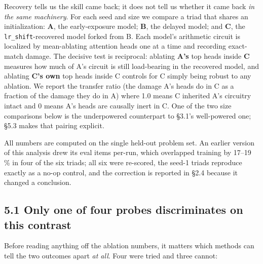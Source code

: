 \documentclass[11pt]{article}
\begin{document}
Recovery tells us the skill came back; it does not tell us whether it came back \emph{in the same
machinery}. For each seed and size we compare a triad that shares an initialization: \textbf{A},
the early-exposure model; \textbf{B}, the delayed model; and \textbf{C}, the \texttt{lr\_shift}-recovered model
forked from B. Each model's arithmetic circuit is localized by mean-ablating attention heads
one at a time and recording exact-match damage. The decisive test is reciprocal: ablating
\textbf{A's} top heads inside \textbf{C} measures how much of A's circuit is still load-bearing in the
recovered model, and ablating \textbf{C's own} top heads inside C controls for C simply being
robust to any ablation. We report the transfer ratio (the damage A's heads do in C as a
fraction of the damage they do in A) where 1.0 means C inherited A's circuitry intact and 0
means A's heads are causally inert in C. One of the two size comparisons below is the
underpowered counterpart to §3.1's well-powered one; §5.3 makes that pairing explicit.

All numbers are computed on the single held-out problem set. An earlier version of this
analysis drew its eval items per-run, which overlapped training by 17--19 \% in four of the six
triads; all six were re-scored, the seed-1 triads reproduce exactly as a no-op control, and
the correction is reported in §2.4 because it changed a conclusion.

\subsection{5.1 Only one of four probes discriminates on this contrast}\label{only-one-of-four-probes-discriminates-on-this-contrast}

Before reading anything off the ablation numbers, it matters which methods can tell the two
outcomes apart \emph{at all}. Four were tried and three cannot:
\end{document}
